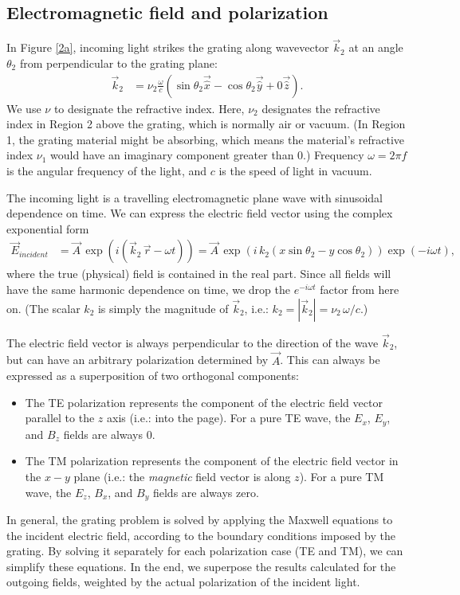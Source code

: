 \subsection{Electromagnetic field and polarization}
In Figure \ref{2a}, incoming light strikes the grating along wavevector $\vec k_2$ at an angle $\theta_2$ from perpendicular to the grating plane:
\begin{align}
\vec k_2 &= \nu_2 \frac{\omega}{c} \left( \sin \theta_2 \vec{\hat x} - \cos \theta_2 \vec{\hat y} + 0 \vec{\hat z} \right).
\end{align}
We use $\nu$ to designate the refractive index. Here, $\nu_2$ designates the refractive index in Region 2 above the grating, which is normally air or vacuum.  (In Region 1, the grating material might be absorbing, which means the material's refractive index $\nu_1$ would have an imaginary component greater than 0.)  Frequency $\omega = 2\pi f$ is the angular frequency of the light, and $c$ is the speed of light in vacuum.

The incoming light is a travelling electromagnetic plane wave with sinusoidal dependence on time.  We can express the electric field vector using the complex exponential form
\begin{align}
\label{eqnPlaneWave}
\vec E_{incident} &= \vec A\, \exp \left(i (\vec k_2 \,  \vec r - \omega t)\right)  = \vec A\, \exp \left(i\, k_2 (x \sin \theta_2 - y \cos \theta_2)\right)\exp \left(- i \omega t\right),
\end{align}
where the true (physical) field is contained in the real part.  Since all fields will have the same harmonic dependence on time, we drop the $e^{-i\omega t}$ factor from here on.  (The scalar $k_2$ is simply the magnitude of $\vec k_2$, i.e.: $k_2 = \left| \vec k_2 \right| = \nu_2\, \omega/c$.)

The electric field vector is always perpendicular to the direction of the wave $\vec k_2$, but can have an arbitrary polarization determined by $\vec A$.  This can always be expressed as a superposition of two orthogonal components:
\begin{itemize}
\item The TE polarization represents the component of the electric field vector parallel to the $z$ axis (i.e.: into the page).  For a pure TE wave, the $E_x$, $E_y$, and $B_z$ fields are always 0.
\item The TM polarization represents the component of the electric field vector in the $x-y$ plane (i.e.: the \emph{magnetic} field vector is along $z$).  For a pure TM wave, the $E_z$, $B_x$, and $B_y$ fields are always zero.
\end{itemize}
In general, the grating problem is solved by applying the Maxwell equations to the incident electric field, according to the boundary conditions imposed by the grating.  By solving it separately for each polarization case (TE and TM), we can simplify these equations.  In the end, we superpose the results calculated for the outgoing fields, weighted by the actual polarization of the incident light.

